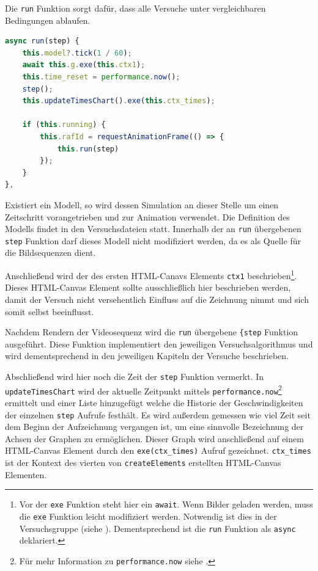 Die \lstinline{run} Funktion sorgt dafür, dass alle Versuche unter vergleichbaren Bedingungen ablaufen.

\begin{lstlisting}[language=JavaScript, caption={Definition der \lstinline{simulation.run} Funktion.}, label={lst:sim_run}]
async run(step) {
    this.model?.tick(1 / 60);
    await this.g.exe(this.ctx1);
    this.time_reset = performance.now();
    step();
    this.updateTimesChart().exe(this.ctx_times);

    if (this.running) {
        this.rafId = requestAnimationFrame(() => {
            this.run(step)
        });
    }
},
\end{lstlisting}

Existiert ein  Modell, so wird dessen Simulation an dieser Stelle um einen Zeitschritt vorangetrieben und zur Animation verwendet.
Die Definition des  Modells findet in den Versuchsdateien statt.
Innerhalb der an \lstinline{run} übergebenen \lstinline{step} Funktion darf dieses Modell nicht modifiziert werden, da es als Quelle für die Bildsequenzen dient.

Anschlie{\ss}end wird der  des ersten  HTML-Canavs Elements \lstinline{ctx1} beschrieben\footnote{Vor der \lstinline{exe} Funktion steht hier ein \lstinline{await}. Wenn Bilder geladen werden, muss die \lstinline{exe} Funktion leicht modifiziert werden. Notwendig ist dies in der Versuchsgruppe  (siehe ).
Dementsprechend ist die \lstinline{run} Funktion als \lstinline{async} deklariert.}.
Dieses HTML-Canvas Element sollte ausschlie{\ss}lich hier beschrieben werden, damit der Versuch nicht versehentlich Einfluss auf die Zeichnung nimmt und sich somit selbst beeinflusst.

Nachdem Rendern der Videosequenz wird die \lstinline{run} übergebene \lstinline{{step} Funktion ausgeführt.
Diese Funktion implementiert den jeweiligen Versuchsalgorithmus und wird dementsprechend in den jeweiligen Kapiteln der Versuche beschrieben.

Abschlie{\ss}end wird hier noch die Zeit der \lstinline{step} Funktion vermerkt.
In \lstinline{updateTimesChart} wird der aktuelle Zeitpunkt mittels \lstinline{performance.now}\footnote{Für mehr Information zu \lstinline{performance.now} siehe .} ermittelt und einer Liste hinzugefügt welche die Historie der Geschwindigkeiten der einzelnen \lstinline{step} Aufrufe festhält.
Es wird au{\ss}erdem gemessen wie viel Zeit seit dem Beginn der Aufzeichnung vergangen ist, um eine sinnvolle Bezeichnung der Achsen der Graphen zu ermöglichen.
Dieser Graph wird anschlie{\ss}end auf einem HTML-Canvas Element durch den \lstinline{exe(ctx_times)} Aufruf gezeichnet.
\lstinline{ctx_times} ist der Kontext des vierten von \lstinline{createElements} erstellten HTML-Canvas Elementen.

